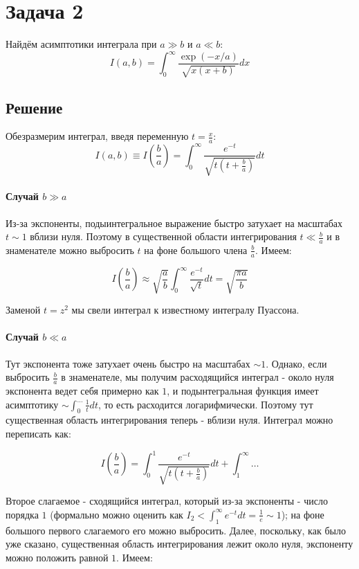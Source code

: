 \documentclass[a4paper,12pt]{article}
\begin{document}
\section*{Задача 2}

Найдём асимптотики интеграла при $a\gg b$ и $a\ll b$:
\[
I(a,b)=\int_{0}^{\infty}\frac{\exp(-x/a)}{\sqrt{x(x+b)}}dx
\]



\subsection*{Решение}

Обезразмерим интеграл, введя переменную $t=\frac{x}{a}$:
\[
I(a,b)\equiv I\left(\frac{b}{a}\right)=\int_{0}^{\infty}\frac{e^{-t}}{\sqrt{t\left(t+\frac{b}{a}\right)}}dt
\]



\paragraph{Случай $b\gg a$}

Из-за экспоненты, подыинтегральное выражение быстро затухает на масштабах
$t\sim1$ вблизи нуля. Поэтому в существенной области интегрирования
$t\ll\frac{b}{a}$ и в знаменателе можно выбросить $t$ на фоне большого
члена $\frac{b}{a}$. Имеем:

\[
I\left(\frac{b}{a}\right)\approx\sqrt{\frac{a}{b}}\int_{0}^{\infty}\frac{e^{-t}}{\sqrt{t}}dt = \sqrt{\frac{\pi a}{b}}
\]

\noindent
Заменой $t=z^{2}$ мы свели интеграл к известному интегралу Пуассона.



\paragraph{Случай $b\ll a$}

Тут экспонента тоже затухает очень быстро на масштабах $\sim1$. Однако,
если выбросить $\frac{b}{a}$ в знаменателе, мы получим расходящийся
интеграл - около нуля экспонента ведет себя примерно как $1$, и подынтегральная
функция имеет асимптотику $\sim\int_{0}^{\dots}\frac{1}{t}dt$,
то есть расходится логарифмически. Поэтому тут существенная область
интегрирования теперь - вблизи нуля. Интеграл можно переписать как:

\[
I\left(\frac{b}{a}\right)=\int_{0}^{1}\frac{e^{-t}}{\sqrt{t\left(t+\frac{b}{a}\right)}}dt+\int_{1}^{\infty}\dots
\]

\noindent
Второе слагаемое - сходящийся интеграл, который из-за экспоненты -
число порядка $1$ (формально можно оценить как $I_{2}<\int_{1}^{\infty}e^{-t}dt=\frac{1}{e}\sim1$);
на фоне большого первого слагаемого его можно выбросить. Далее, поскольку,
как было уже сказано, существенная область интегрирования лежит около
нуля, экспоненту можно положить равной $1$. Имеем:
\end{document}
